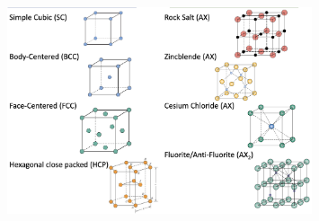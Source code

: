 \documentclass{article}
\begin{document}

\begin{figure}[H]
    \centering
    \includegraphics[width=0.8\textwidth]{structures.png}
\end{figure}

\end{document}
